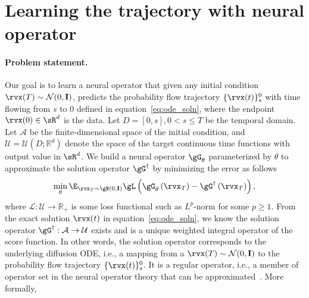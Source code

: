 
\section{Learning the trajectory with neural operator}
\paragraph{Problem statement.}
Our goal is to learn a neural operator that given any initial condition $\rvx(T)\sim \mathcal{N}(0,\mathbf{I})$, predicts the probability flow trajectory $\{\rvx(t)\}_{s}^{0}$ with time flowing from $s$ to $0$ defined in equation~\ref{eq:ode_soln}, where the endpoint $\rvx(0) \in \sR^d$ is the data. 
Let $D=[0, s], 0 < s \leq T$ be the temporal domain. 
Let $\mathcal{A}$ be the finite-dimensional space of the initial condition, and $\mathcal{U}=\mathcal{U}(D; \mathbb{R}^d)$ denote the space of the target continuous time functions with output value in $\sR^d$. 
We build a neural operator $\gG_{\theta}$ parameterized by $\theta$ to approximate the solution operator $\gG^\dagger$ by minimizing the error as follows
\begin{equation}
    \min_{\theta} \E_{\rvx_T \sim \gN(0,\mathbf{I})} \gL\left(\gG_{\theta}\left(\rvx_T\right) - \gG^\dagger\left(\rvx_T\right)\right),
    \label{eq:}
\end{equation}
where 
$\mathcal{L}: \mathcal{U}  \rightarrow \mathbb{R}_+$ 
is some loss functional such as $L^{p}$-norm for some $p\geq 1$. From the exact solution $\rvx(t)$ in equation~\ref{eq:ode_soln}, we know the solution operator $\gG^\dagger: \mathcal{A} \rightarrow \mathcal{U}$ exists and is a unique weighted integral operator of the score function. In other words, 
the solution operator corresponds to the underlying diffusion ODE, i.e., a mapping from a $\rvx(T)\sim \mathcal{N}(0,\mathbf{I})$ to the probability flow trajectory $\{\rvx(t)\}_{s}^{0}$. 
It is a regular operator, i.e., a member of operator set in the neural operator theory that can be approximated~\citep{kovachki2021neural,kovachki2021universal}. More formally,

